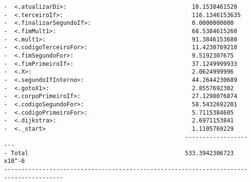 \begin{verbatim}
-  <.atualizarDi>:                                    10.1538461520
-  <.terceiroIf>:                                     116.1346153635
-  <.finalizarSegundoIf>:                             0.0000000000
-  <.fimMult1>:                                       68.5384615260
-  <.mult1>:                                          91.3846153680
-  <.codigoTerceiroFor>:                              11.4230769210
-  <.fimSegundoFor>:                                  9.5192307675
-  <.fimPrimeiroIf>:                                  37.1249999933
-  <.X>:                                              2.0624999996
-  <.segundoIfInterno>:                               44.2644230689
-  <.gotoX1>:                                         2.8557692302
-  <.corpoPrimeiroIf>:                                27.1298076874
-  <.codigoSegundoFor>:                               58.5432692201
-  <.codigoPrimeiroFor>:                              5.7115384605
-  <.dijkstra>:                                       2.6971153841
-  <._start>                                          1.1105769229
                                                    ---------------------
- Total                                             533.3942306723 x10^-6
---------------------------------------------------------------------------------------
\end{verbatim}

